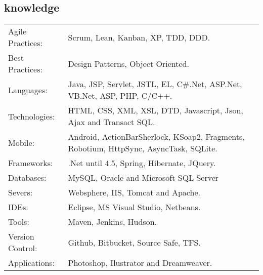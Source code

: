 \documentclass[a4paper, oneside, final]{scrartcl}
\begin{document}
\begin{center}
\section{knowledge}
\begin{tabularx}{1\linewidth}{p{3.0cm}X}
Agile Practices: & Scrum, Lean, Kanban, XP, TDD, DDD.\\
Best Practices:  & Design Patterns, Object Oriented.\\
Languages:       & Java, JSP, Servlet, JSTL, EL, C\#.Net, ASP.Net, VB.Net, ASP, PHP, C/C++.\\
Technologies:    & HTML, CSS, XML, XSL, DTD, Javascript, Json, Ajax and Transact SQL.\\
Mobile:          & Android, ActionBarSherlock, KSoap2, Fragments, Robotium, HttpSync, AsyncTask, SQLite.\\
Frameworks:      & .Net until 4.5, Spring, Hibernate, JQuery.\\
Databases:       & MySQL, Oracle and Microsoft SQL Server \\
Severs:          & Websphere, IIS, Tomcat and Apache.\\
IDEs:            & Eclipse, MS Visual Studio, Netbeans.\\
Tools:			 & Maven, Jenkins, Hudson.\\
Version Control: & Github, Bitbucket, Source Safe, TFS.\\
Applications:    & Photoshop, Ilustrator and Dreamweaver.\\
\end{tabularx}

\end{center}
\end{document}
